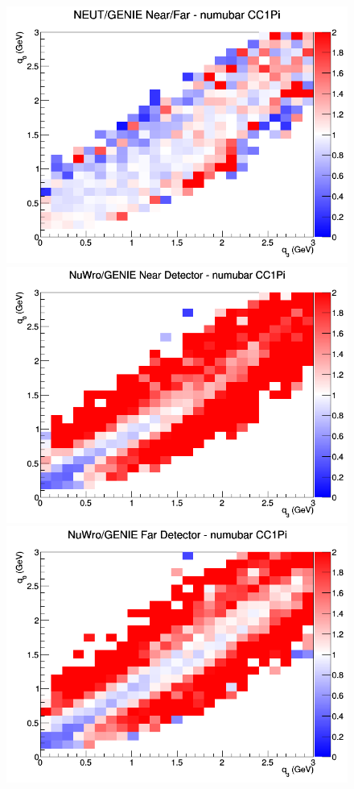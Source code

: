 \documentclass[12pt]{article}
\begin{document}
\begin{figure}[h]
\endminipage
{}
\includegraphics[width=\linewidth]{eff_q0_q3/LAr/ratios/CC1Pi_NEUT_GENIE_numubar_NF_q3_q0.png}
\endminipage
\newline
{}
\includegraphics[width=\linewidth]{eff_q0_q3/LAr/ratios/CC1Pi_NuWro_GENIE_numubar_near_q3_q0.png}
\endminipage
{}
\includegraphics[width=\linewidth]{eff_q0_q3/LAr/ratios/CC1Pi_NuWro_GENIE_numubar_far_q3_q0.png}

\end{figure}
\end{document}
